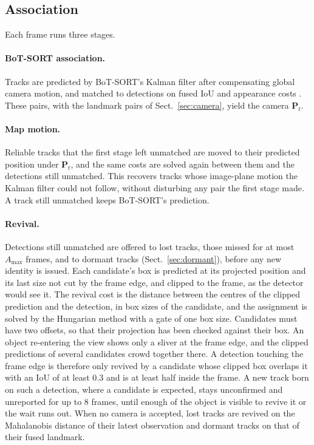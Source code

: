 \documentclass[pdflatex,sn-basic]{sn-jnl}%
\theoremstyle{thmstyleone}%
\newcommand{\bP}{\bm{P}}
\begin{document}
\subsection{Association}\label{sec:assoc}

Each frame runs three stages.

\paragraph{BoT-SORT association.} Tracks are predicted by BoT-SORT's Kalman filter after compensating global camera motion, and matched to detections on fused IoU and appearance costs \citep{aharon2022botsort}. These pairs, with the landmark pairs of Sect.~\ref{sec:camera}, yield the camera $\bP_t$.

\paragraph{Map motion.} Reliable tracks that the first stage left unmatched are moved to their predicted position under $\bP_t$, and the same costs are solved again between them and the detections still unmatched. This recovers tracks whose image-plane motion the Kalman filter could not follow, without disturbing any pair the first stage made. A track still unmatched keeps BoT-SORT's prediction.

\paragraph{Revival.} Detections still unmatched are offered to lost tracks, those missed for at most $A_{\max}$ frames, and to dormant tracks (Sect.~\ref{sec:dormant}), before any new identity is issued. Each candidate's box is predicted at its projected position and its last size not cut by the frame edge, and clipped to the frame, as the detector would see it. The revival cost is the distance between the centres of the clipped prediction and the detection, in box sizes of the candidate, and the assignment is solved by the Hungarian method with a gate of one box size. Candidates must have two offsets, so that their projection has been checked against their box. An object re-entering the view shows only a sliver at the frame edge, and the clipped predictions of several candidates crowd together there. A detection touching the frame edge is therefore only revived by a candidate whose clipped box overlaps it with an IoU of at least 0.3 and is at least half inside the frame. A new track born on such a detection, where a candidate is expected, stays unconfirmed and unreported for up to 8 frames, until enough of the object is visible to revive it or the wait runs out. When no camera is accepted, lost tracks are revived on the Mahalanobis distance of their latest observation and dormant tracks on that of their fused landmark.
\end{document}
